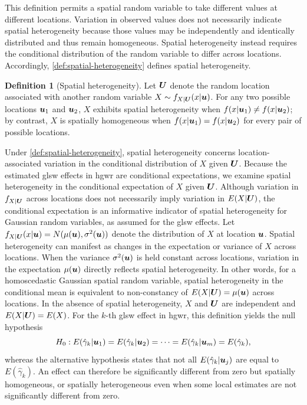 \documentclass[times]{interact}
\theoremstyle{plain}%
\theoremstyle{definition}
\newtheorem{definition}[definition]{Definition}
\theoremstyle{remark}
\begin{document}
This definition permits a spatial random variable to take different values at different locations.
Variation in observed values does not necessarily indicate spatial heterogeneity because those values may be independently and identically distributed and thus remain homogeneous.
Spatial heterogeneity instead requires the conditional distribution of the random variable to differ across locations.
Accordingly, \autoref{def:spatial-heterogeneity} defines spatial heterogeneity.

\begin{definition}[Spatial heterogeneity] \label{def:spatial-heterogeneity}
  Let $\bm{U}$ denote the random location associated with another random variable $X\sim f_{X|\bm{U}}(x|\bm{u})$.
  For any two possible locations $\bm{u}_1$ and $\bm{u}_2$, $X$ exhibits spatial heterogeneity when $f(x|\bm{u}_1)\neq f(x|\bm{u}_2)$; by contrast, $X$ is spatially homogeneous when $f(x|\bm{u}_1)=f(x|\bm{u}_2)$ for every pair of possible locations.
\end{definition}

Under \autoref{def:spatial-heterogeneity}, spatial heterogeneity concerns location-associated variation in the conditional distribution of $X$ given $\bm{U}$.
Because the estimated \gls{glsw} effects in \gls{hgwr} are conditional expectations, we examine spatial heterogeneity in the conditional expectation of $X$ given $\bm{U}$.
Although variation in $f_{X|\bm{U}}$ across locations does not necessarily imply variation in $E(X|\bm{U})$, the conditional expectation is an informative indicator of spatial heterogeneity for Gaussian random variables, as assumed for the \gls{glsw} effects.
Let $f_{X|\bm{U}}(x|\bm{u})=N(\mu(\bm{u}),\sigma^2(\bm{u}))$ denote the distribution of $X$ at location $\bm{u}$.
Spatial heterogeneity can manifest as changes in the expectation or variance of $X$ across locations.
When the variance $\sigma^2(\bm{u})$ is held constant across locations, variation in the expectation $\mu(\bm{u})$ directly reflects spatial heterogeneity.
In other words, for a homoscedastic Gaussian spatial random variable, spatial heterogeneity in the conditional mean is equivalent to non-constancy of $E(X|\bm{U})=\mu(\bm{u})$ across locations.
In the absence of spatial heterogeneity, $X$ and $\bm{U}$ are independent and $E(X|\bm{U})=E(X)$.
For the $k$-th \gls{glsw} effect in \gls{hgwr}, this definition yields the null hypothesis
\begin{equation}\label{equ:glsw-heterogeneity-core-hypothesis}
  H_0: E(\hat{\gamma}_k|\bm{u}_{1})=E(\hat{\gamma}_k|\bm{u}_{2})=\cdots=E(\hat{\gamma}_k|\bm{u}_{m})=E(\hat{\gamma}_k),
\end{equation}
whereas the alternative hypothesis states that not all $E(\hat{\gamma}_k|\bm{u}_{j})$ are equal to $E(\hat{\gamma}_k)$.
An effect can therefore be significantly different from zero but spatially homogeneous, or spatially heterogeneous even when some local estimates are not significantly different from zero.
\end{document}
